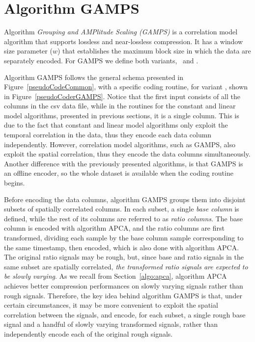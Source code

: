 
\clearpage

\section{Algorithm GAMPS}
\label{algo:gamps}


\vspace{-10pt}
Algorithm \textit{Grouping and AMPlitude Scaling (GAMPS)} \cite{coder:gamps} is a correlation model algorithm that supports lossless and near-lossless compression. It has a window size parameter ($w$) that establishes the maximum block size in which the data are separately encoded. For GAMPS we define both variants, \maskalgo\ and \NOmaskalgo.


Algorithm GAMPS follows the general schema presented in Figure~\ref{pseudoCodeCommon}, with a specific coding routine, for variant \maskalgo, shown in Figure~\ref{pseudoCoderGAMPS}. Notice that the first input consists of all the columns in the csv data file, while in the routines for the constant and linear model algorithms, presented in previous sections, it is a single column. This is due to the fact that constant and linear model algorithms only exploit the temporal correlation in the data, thus they encode each data column independently. However, correlation model algorithms, such as GAMPS, also exploit the spatial correlation, thus they encode the data columns simultaneously. Another difference with the previously presented algorithms, is that GAMPS is an offline encoder, so the whole dataset is available when the coding routine begins. 


Before encoding the data columns, algorithm GAMPS groups them into disjoint subsets of spatially correlated columns. In each subset, a single \textit{base column} is defined, while the rest of its columns are referred to as \textit{ratio columns}. The base column is encoded with algorithm APCA, and the ratio columns are first transformed, dividing each sample by the base column sample corresponding to the same timestamp, then encoded, which is also done with algorithm APCA. The original ratio signals may be rough, but, since base and ratio signals in the same subset are spatially correlated, \textit{the transformed ratio signals are expected to be slowly varying}. As we recall from Section~\ref{algo:apca}, algorithm APCA achieves better compression performances on slowly varying signals rather than rough signals. Therefore, the key idea behind algorithm GAMPS is that, under certain circumstances, it may be more convenient to exploit the spatial correlation between the signals, and encode, for each subset, a single rough base signal and a handful of slowly varying transformed signals, rather than independently encode each of the original rough signals.


